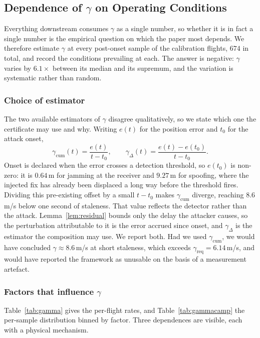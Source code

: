 \subsection{Dependence of $\gamma$ on Operating Conditions}
\label{sec:gammastability}
Everything downstream consumes $\gamma$ as a single number, so whether it is in
fact a single number is the empirical question on which the paper most depends.
We therefore estimate $\gamma$ at every post-onset sample of the calibration
flights, $674$ in total, and record the conditions prevailing at each. The
answer is negative: $\gamma$ varies by $6.1\times$ between its median and its
supremum, and the variation is systematic rather than random.

\subsubsection{Choice of estimator}
The two available estimators of $\gamma$ disagree qualitatively, so
we state which one the certificate may use and why. Writing $e(t)$ for the
position error and $t_0$ for the attack onset,
\begin{equation}
\label{eq:gammaest}
\gamma_{\mathrm{cum}}(t)=\frac{e(t)}{t-t_0},
\qquad
\gamma_{\Delta}(t)=\frac{e(t)-e(t_0)}{t-t_0}.
\end{equation}
Onset is declared when the error crosses a detection threshold, so $e(t_0)$ is
non-zero: it is $0.64$\,m for jamming at the receiver and $9.27$\,m for
spoofing, where the injected fix has already been displaced a long way before
the threshold fires. Dividing this pre-existing offset by a small $t-t_0$ makes
$\gamma_{\mathrm{cum}}$ diverge, reaching $8.6$\,m/s below one second of
staleness. That value reflects the detector rather than the attack.
Lemma~\ref{lem:residual} bounds only the delay the attacker causes, so the
perturbation attributable to it is the error accrued since onset, and
$\gamma_{\Delta}$ is the estimator the composition may use. We report both. Had
we used $\gamma_{\mathrm{cum}}$, we would have concluded
$\gamma\approx8.6$\,m/s at short staleness, which exceeds
$\gamma_{\mathrm{req}}=6.14$\,m/s, and would have reported the framework as
unusable on the basis of a measurement artefact.

\subsubsection{Factors that influence $\gamma$}
Table~\ref{tab:gamma} gives the per-flight rates, and Table~\ref{tab:gammacamp}
the per-sample distribution binned by factor. Three dependences are visible,
each with a physical mechanism.

